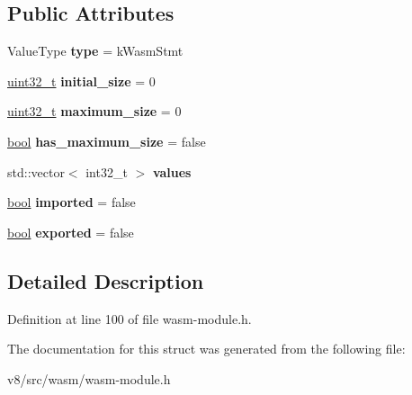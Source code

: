 \subsection*{Public Attributes}
\begin{DoxyCompactItemize}
\item 
\mbox{\label{structv8_1_1internal_1_1wasm_1_1WasmTable_ad0e496778b35061aea0290095032db9d}} 
Value\+Type {\bfseries type} = k\+Wasm\+Stmt
\item 
\mbox{\label{structv8_1_1internal_1_1wasm_1_1WasmTable_a22aa0bbc677fa41ee9f07d8ae5487805}} 
\mbox{\hyperlink{classuint32__t}{uint32\+\_\+t}} {\bfseries initial\+\_\+size} = 0
\item 
\mbox{\label{structv8_1_1internal_1_1wasm_1_1WasmTable_ac0968291ec2da1d0b81161b6f5dd8cbd}} 
\mbox{\hyperlink{classuint32__t}{uint32\+\_\+t}} {\bfseries maximum\+\_\+size} = 0
\item 
\mbox{\label{structv8_1_1internal_1_1wasm_1_1WasmTable_a1642a2f96ec45b278d73d7014bd34bf5}} 
\mbox{\hyperlink{classbool}{bool}} {\bfseries has\+\_\+maximum\+\_\+size} = false
\item 
\mbox{\label{structv8_1_1internal_1_1wasm_1_1WasmTable_a26fdf8c037a953db4697be78d1b66e59}} 
std\+::vector$<$ int32\+\_\+t $>$ {\bfseries values}
\item 
\mbox{\label{structv8_1_1internal_1_1wasm_1_1WasmTable_a1b3c590882cffb72c44f91d0ea6f88e4}} 
\mbox{\hyperlink{classbool}{bool}} {\bfseries imported} = false
\item 
\mbox{\label{structv8_1_1internal_1_1wasm_1_1WasmTable_ab5a3f8d876b4e5c77b3e4c6b36fe7e9e}} 
\mbox{\hyperlink{classbool}{bool}} {\bfseries exported} = false
\end{DoxyCompactItemize}


\subsection{Detailed Description}


Definition at line 100 of file wasm-\/module.\+h.



The documentation for this struct was generated from the following file\+:\begin{DoxyCompactItemize}
\item 
v8/src/wasm/wasm-\/module.\+h\end{DoxyCompactItemize}
